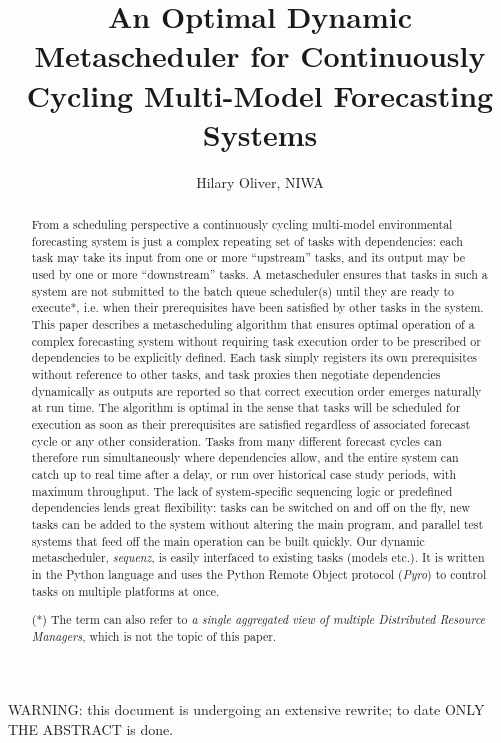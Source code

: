 \documentclass[11pt,a4paper]{article}
\title{An Optimal Dynamic Metascheduler for Continuously Cycling
Multi-Model Forecasting Systems}
\author{Hilary Oliver, NIWA}
\begin{document}
\maketitle
\tableofcontents

{\huge WARNING: this document is undergoing an extensive rewrite; to
date ONLY THE ABSTRACT is done.}

\begin{abstract}

From a scheduling perspective a continuously cycling multi-model
environmental forecasting system is just a complex repeating set of
tasks with dependencies: each task may take its input from one or more
``upstream'' tasks, and its output may be used by one or more
``downstream'' tasks.  A metascheduler ensures that tasks in such a
system are not submitted to the batch queue scheduler(s) until they are
ready to execute*, i.e. when their prerequisites have been satisfied by
other tasks in the system. This paper describes a metascheduling
algorithm that ensures optimal operation of a complex forecasting system
without requiring task execution order to be prescribed or dependencies
to be explicitly defined. Each task simply registers its own
prerequisites without reference to other tasks, and task proxies then
negotiate dependencies dynamically as outputs are reported so that
correct execution order emerges naturally at run time.  The algorithm is
optimal in the sense that tasks will be scheduled for execution as soon
as their prerequisites are satisfied regardless of associated forecast
cycle or any other consideration. Tasks from many different forecast
cycles can therefore run simultaneously where dependencies allow, and
the entire system can catch up to real time after a delay, or run over
historical case study periods, with maximum throughput. The lack of
system-specific sequencing logic or predefined dependencies lends great
flexibility: tasks can be switched on and off on the fly, new tasks can
be added to the system without altering the main program, and parallel
test systems that feed off the main operation can be built quickly. Our
dynamic metascheduler, {\em sequenz}, is easily interfaced to existing
tasks (models etc.). It is written in the Python language and uses the
Python Remote Object protocol ({\em Pyro}) to control tasks on multiple
platforms at once. 

(*) The term can also refer to {\it a single aggregated view of multiple
Distributed Resource Managers}, which is not the topic of this paper.

\end{abstract}
\end{document}
